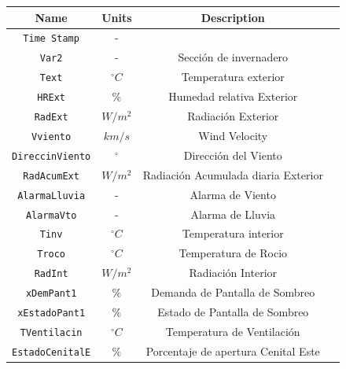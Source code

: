 \begin{table}
    \centering
    \begin{tabular}{|c|c|c|c|}
        \hline
        \textbf{Name}           & \textbf{Units} & \textbf{Description}         \\ 
        \hline
        \texttt{Time Stamp}         & -              &                              \\ \hline
        \texttt{Var2}               & -              & Sección de invernadero       \\ \hline
        \texttt{Text}               & $^\circ C$     & Temperatura exterior         \\ \hline
        \texttt{HRExt}              & \%             & Humedad relativa Exterior    \\ \hline
        \texttt{RadExt}             & $W/m^2$        & Radiación Exterior           \\ \hline
        \texttt{Vviento}            & $km/s$         & Wind Velocity                \\  \hline
        \texttt{DireccinViento}     & $^\circ$       & Dirección del Viento         \\ \hline
        \texttt{RadAcumExt}         & $W/m^2$        & Radiación Acumulada diaria Exterior \\ \hline
        \texttt{AlarmaLluvia}       & -              & Alarma de Viento             \\ \hline
        \texttt{AlarmaVto}          & -              & Alarma de Lluvia             \\ \hline
        \texttt{Tinv}               & $^\circ C$     & Temperatura interior         \\ \hline
        \texttt{Troco}              & $^\circ C$     & Temperatura de Rocio         \\  \hline
        \texttt{RadInt}             & $W/m^2$        & Radiación Interior               \\ \hline
        \texttt{xDemPant1}          & $\%$           & Demanda de Pantalla de Sombreo   \\ \hline
        \texttt{xEstadoPant1}       & $\%$           & Estado de Pantalla de Sombreo    \\ \hline
        \texttt{TVentilacin}        & $^\circ C$     & Temperatura de Ventilación       \\ \hline
        \texttt{EstadoCenitalE}     & $\%$           & Porcentaje de apertura Cenital Este      \\ \hline

\end{tabular}
\end{table}
